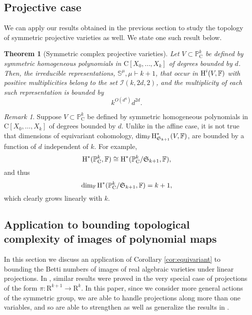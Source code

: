 \documentclass{amsart}
\newtheorem{theorem}{Theorem}
\theoremstyle{definition}
\theoremstyle{remark}
\newtheorem{remark}{Remark}
\numberwithin{equation}{section}
\begin{document}
\subsection{Projective case}
We can apply our results obtained in the previous section to study the topology of symmetric projective
varieties as well. 
We state one such result below.

\begin{theorem}[Symmetric complex projective varieties]
\label{thm:symmetric-complex-projective}
Let $V \subset {\mathbb{P}}_{\mathrm{C}}^k$ be defined by symmetric homogeneous polynomials in ${\mathrm{C}}[X_0,\ldots,X_k]$
of degrees bounded by $d$. 
Then, the irreducible representations, $\mathbb{S}^\mu, \mu \vdash k+1$,  that occur in
${\mbox{\rm H}}^i(V,{\mathbb{F}})$ with positive multiplicities belong to the set 
$\mathcal{I}(k,2d,2)$,
and the multiplicity 
of each such representation is bounded by 
\[
k^{O(d^{4})} d^{2d}.
\]
\end{theorem}

\begin{remark}
\label{rem:symmetric-complex-projective}
Suppose $V \subset {\mathbb{P}}_{\mathrm{C}}^k$ be defined by symmetric homogeneous polynomials 
in ${\mathrm{C}}[X_0,\ldots,X_k]$ of degrees bounded by $d$.
Unlike in the affine case, it is not true that dimensions of equivariant cohomology,
$\dim_{\mathbb{F}} {\mbox{\rm H}}_{\mathfrak{S}_{k+1}}^*(V,{\mathbb{F}})$,
are bounded by a function of $d$ independent of $k$.
For example,
\[
{\mbox{\rm H}}^*({\mathbb{P}}_{\mathrm{C}}^k,{\mathbb{F}}) \cong {\mbox{\rm H}}^*({\mathbb{P}}_{\mathrm{C}}^k/\mathfrak{S}_{k+1},{\mathbb{F}}),
\]
 and thus
 \[\dim_{\mathbb{F}}  {\mbox{\rm H}}^*({\mathbb{P}}_{\mathrm{C}}^k/\mathfrak{S}_{k+1},{\mathbb{F}}) = k+1,
 \]
 which clearly grows linearly with $k$.
\end{remark}

\subsection{Application to bounding topological complexity of images of polynomial maps}
\label{subsec:non-equivariant} 
In this section we discuss an application of 
Corollary  \ref{cor:equivariant}  
to bounding the Betti
numbers of images of real algebraic varieties under linear projections.
In \cite{BC2013}, similar results were proved in the very special case of projections of the form 
$\pi:{\mathrm{R}}^{k+1} \rightarrow {\mathrm{R}}^k$. In this paper, since we consider more general actions of the symmetric group, we are able to handle projections along more than one variables, and so are
able to strengthen as well as generalize the results in \cite{BC2013}.
\end{document}
